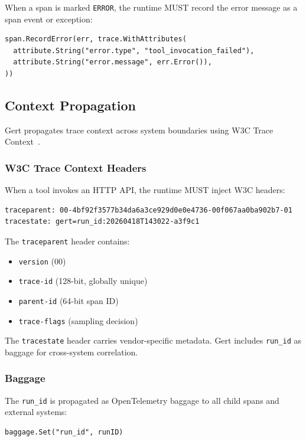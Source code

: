 When a span is marked \texttt{ERROR}, the runtime MUST record the error message as a span event or exception:

\begin{verbatim}
span.RecordError(err, trace.WithAttributes(
  attribute.String("error.type", "tool_invocation_failed"),
  attribute.String("error.message", err.Error()),
))
\end{verbatim}

\subsection{Context Propagation}

Gert propagates trace context across system boundaries using W3C Trace Context~\cite{w3c-trace-context}.

\subsubsection{W3C Trace Context Headers}

When a tool invokes an HTTP API, the runtime MUST inject W3C headers:

\begin{verbatim}
traceparent: 00-4bf92f3577b34da6a3ce929d0e0e4736-00f067aa0ba902b7-01
tracestate: gert=run_id:20260418T143022-a3f9c1
\end{verbatim}

The \texttt{traceparent} header contains:
\begin{itemize}
  \item \texttt{version} (00)
  \item \texttt{trace-id} (128-bit, globally unique)
  \item \texttt{parent-id} (64-bit span ID)
  \item \texttt{trace-flags} (sampling decision)
\end{itemize}

The \texttt{tracestate} header carries vendor-specific metadata. Gert includes \texttt{run\_id} as baggage for cross-system correlation.

\subsubsection{Baggage}

The \texttt{run\_id} is propagated as OpenTelemetry baggage to all child spans and external systems:

\begin{verbatim}
baggage.Set("run_id", runID)
\end{verbatim}

